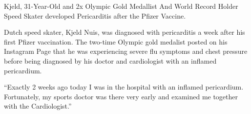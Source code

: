 Kjeld, 31-Year-Old and 2x Olympic Gold Medallist And World Record Holder Speed
Skater developed Pericarditis after the Pfizer Vaccine.

Dutch speed skater, Kjeld Nuis, was diagnosed with pericarditis a week after his
first Pfizer vaccination. The two-time Olympic gold medalist posted on his
Instagram Page that he was experiencing severe flu symptoms and chest pressure
before being diagnosed by his doctor and cardiologist with an inflamed
pericardium.

“Exactly 2 weeks ago today I was in the hospital with an inflamed
pericardium. Fortunately, my sports doctor was there very early and examined me
together with the Cardiologist.”
